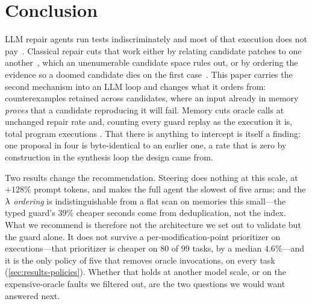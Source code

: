 \section{Conclusion}
\label{sec:conclusion}

LLM repair agents run tests indiscriminately and most of that execution does
not pay~\cite{lin2026run,chen2026rethinking}. Classical repair cuts that work
either by relating candidate patches to one
another~\cite{weimer2013leveraging,mechtaev2018testequivalence}, which an
unenumerable candidate space rules out, or by ordering the evidence so a doomed
candidate dies on the first
case~\cite{qi2013efficient,venugopal2020modification}.
This paper carries the second mechanism into an LLM loop and changes what it
orders from: counterexamples retained across candidates, where an input already
in memory \emph{proves} that a candidate reproducing it will fail. Memory cuts
oracle calls  at unchanged repair rate and, counting every guard
replay as the execution it is, total program executions . That there
is anything to intercept is itself a finding: one proposal in four is
byte-identical to an earlier one, a rate that is zero by construction in the
synthesis loop the design came from.

Two results change the recommendation. Steering does nothing at this scale, at
$+128\%$ prompt tokens, and makes the full agent the slowest of five arms; and
the $\lambda$ \emph{ordering} is indistinguishable from a flat scan on memories
this small---the typed guard's $39\%$ cheaper seconds come from deduplication,
not the index. What we recommend is therefore not the
architecture we set out to validate but the guard alone. It does not survive a per-modification-point prioritizer on
executions---that prioritizer is cheaper on $80$ of $99$ tasks, by a median
$4.6\%$---and it is the only policy of five that removes oracle invocations, on
every task (\cref{sec:results-policies}). Whether that holds at another
model scale, or on the expensive-oracle faults we filtered out, are the two
questions we would want answered next.
